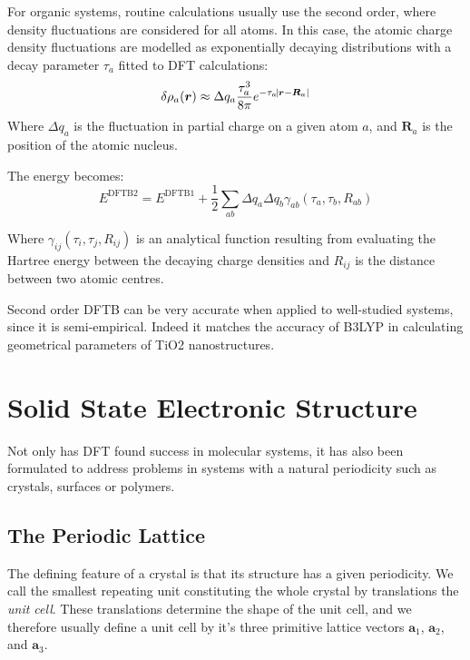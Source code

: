 For organic systems, routine calculations usually use the second order, where density fluctuations are considered for all atoms. In this case, the atomic charge density fluctuations are modelled as exponentially decaying distributions with a decay parameter $\tau_a$ fitted to DFT calculations:
\begin{equation}
    \delta \rho_a(\bm{r}) \approx \Delta q_a \frac{\tau_a^3}{8\pi}e^{-\tau_a\abs{\bm{r}-\bm{R}_a}}
\end{equation}
Where $\Delta q_a$ is the fluctuation in partial charge on a given atom $a$, and $\bm{R}_a$ is the position of the atomic nucleus.

The energy becomes:
\begin{equation}
    E^{\text{DFTB2}}=E^{\text{DFTB1}} + \frac{1}{2}\sum_{ab} \Delta q_a \Delta q_b \gamma_{ab}(\tau_a,\tau_b,R_{ab})\end{equation}

 Where $\gamma_{ij}(\tau_i,\tau_j,R_{ij})$ is an analytical function resulting from evaluating the Hartree energy between the decaying charge densities and $R_{ij}$ is the distance between two atomic centres.\cite{Foulkes1989}
 
 Second order DFTB can be very accurate when applied to well-studied systems, since it is semi-empirical. Indeed it matches the accuracy of B3LYP in calculating geometrical parameters of TiO2 nanostructures.\cite{Selli2017}
\section{Solid State Electronic Structure}

Not only has DFT found success in molecular systems, it has also been formulated to address problems in systems with a natural periodicity such as crystals, surfaces or polymers.

\subsection{The Periodic Lattice}



The defining feature of a crystal is that its structure has a given periodicity. We call the smallest repeating unit constituting the whole crystal by translations the \textit{unit cell}. These translations determine the shape of the unit cell, and we therefore usually define a unit cell by it's three primitive lattice vectors $\bm{a}_1$, $\bm{a}_2$, and $\bm{a}_3$.

